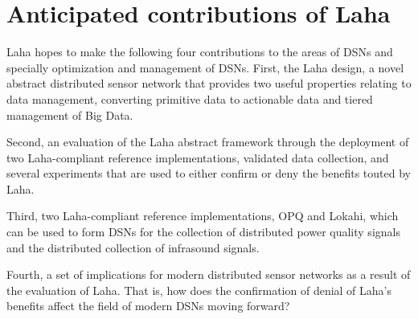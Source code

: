 \section{Anticipated contributions of Laha}
Laha hopes to make the following four contributions to the areas of DSNs and specially optimization and management of DSNs.  First, the Laha design, a novel abstract distributed sensor network that provides two useful properties relating to data management, converting primitive data to actionable data and tiered management of Big Data.

Second, an evaluation of the Laha abstract framework through the deployment of two Laha-compliant reference implementations, validated data collection, and several experiments that are used to either confirm or deny the benefits touted by Laha. 

Third, two Laha-compliant reference implementations, OPQ and Lokahi, which can be used to form DSNs for the collection of distributed power quality signals and the distributed collection of infrasound signals.

Fourth, a set of implications for modern distributed sensor networks as a result of the evaluation of Laha. That is, how does the confirmation of denial of Laha's benefits affect the field of modern DSNs moving forward?





